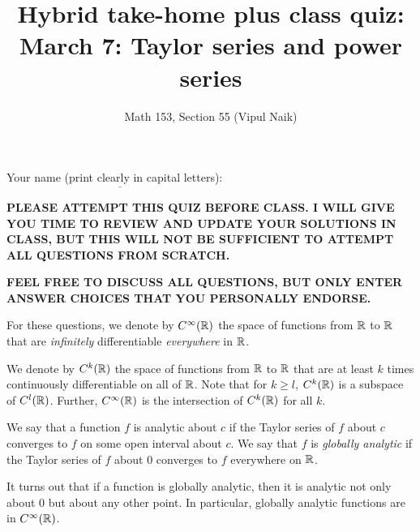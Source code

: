 \documentclass[10pt]{amsart}
\title{Hybrid take-home plus class quiz: March 7: Taylor series and power series}
\author{Math 153, Section 55 (Vipul Naik)}
\begin{document}
\maketitle

Your name (print clearly in capital letters): $\underline{\qquad\qquad\qquad\qquad\qquad\qquad\qquad\qquad\qquad\qquad}$

{\bf PLEASE ATTEMPT THIS QUIZ BEFORE CLASS. I WILL GIVE YOU TIME TO
REVIEW AND UPDATE YOUR SOLUTIONS IN CLASS, BUT THIS WILL NOT BE
SUFFICIENT TO ATTEMPT ALL QUESTIONS FROM SCRATCH.}

{\bf FEEL FREE TO DISCUSS ALL QUESTIONS, BUT ONLY ENTER ANSWER CHOICES
THAT YOU PERSONALLY ENDORSE.}

For these questions, we denote by $C^\infty(\mathbb{R})$ the space of
functions from $\mathbb{R}$ to $\mathbb{R}$ that are {\em infinitely} differentiable
{\em everywhere} in $\mathbb{R}$.

We denote by $C^k(\mathbb{R})$ the space of functions from $\mathbb{R}$ to $\mathbb{R}$ that
are at least $k$ times continuously differentiable on all of
$\mathbb{R}$. Note that for $k \ge l$, $C^k(\mathbb{R})$ is a subspace of
$C^l(\mathbb{R})$. Further, $C^\infty(\mathbb{R})$ is the intersection of $C^k(\mathbb{R})$
for all $k$.

We say that a function $f$ is analytic about $c$ if the Taylor series
of $f$ about $c$ converges to $f$ on some open interval about $c$. We
say that $f$ is {\em globally analytic} if the Taylor series of $f$
about $0$ converges to $f$ everywhere on $\mathbb{R}$.

It turns out that if a function is globally analytic, then it is
analytic not only about $0$ but about any other point. In particular,
globally analytic functions are in $C^\infty(\mathbb{R})$.
\end{document}
